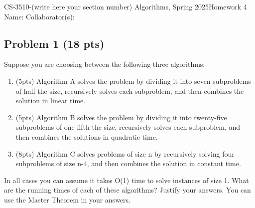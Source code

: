 \documentclass[12pt]{article}
\begin{document}
\noindent CS-3510-(write here your section number) Algorithms, Spring 2025\hfill Homework 4\\
Name: \hfill Collaborator(s):

\hrulefill

\subsection*{Problem 1 (18 pts)}
Suppose you are choosing between the following three algorithms:
\begin{enumerate}[label=(\alph*)]
    \item (5pts) Algorithm A solves the problem by dividing it into seven subproblems of half the size, recursively solves each subproblem, and then combines the solution in linear time. 
    \item (5pts) Algorithm B solves the problem by dividing it into twenty-five subproblems of one fifth the size, recursively solves each subproblem, and then combines the solutions in quadratic time.
    \item (8pts) Algorithm C solves problems of size n by recursively solving four subproblems of size n-4, and then combines the solution in constant time.
\end{enumerate}
In all cases you can assume it takes O(1) time to solve instances of size 1. What are the running times of each of these algorithms? Justify your answers. You can use the Master Theorem in your answers.
\end{document}
